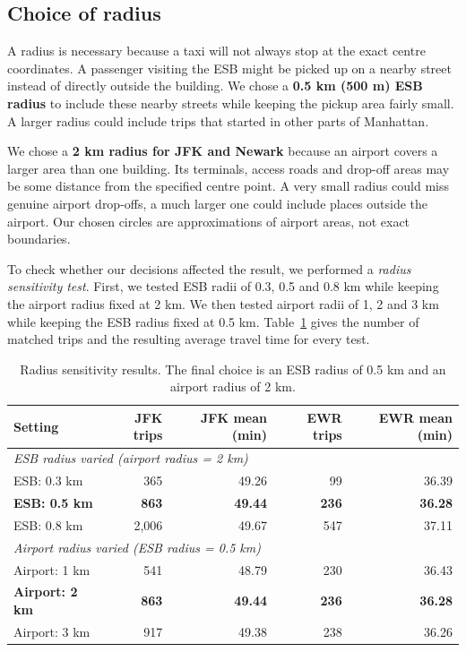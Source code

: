 \documentclass{article}
\begin{document}
\subsection*{Choice of radius}

A radius is necessary because a taxi will not always stop at the exact
centre coordinates. A passenger visiting the ESB might
be picked up on a nearby street instead of directly outside the
building. We chose a \textbf{0.5 km (500 m) ESB radius} to include these
nearby streets while keeping the pickup area fairly small. A larger
radius could include trips that started in other parts of Manhattan.

We chose a \textbf{2 km radius for JFK and Newark} because an airport
covers a larger area than one building. Its terminals, access roads and
drop-off areas may be some distance from the specified centre point. A
very small radius could miss genuine airport drop-offs, a much larger
one could include places outside the airport. Our chosen circles are
approximations of airport areas, not exact boundaries.

To check whether our decisions affected the result, we performed a
\emph{radius sensitivity test}. First, we tested ESB radii of 0.3,
0.5 and 0.8 km while keeping the airport radius fixed at 2 km. We
then tested airport radii of 1, 2 and 3 km while keeping the ESB radius
fixed at 0.5 km. Table~\ref{tab:q5_radii} gives the number of matched
trips and the resulting average travel time for every test.

\begin{table}[H]
    \centering
    \footnotesize
    \setlength{\tabcolsep}{3pt}
    \caption{Radius sensitivity results. The final choice is an ESB radius
    of 0.5 km and an airport radius of 2 km.}
    \label{tab:q5_radii}
    \begin{tabular}{lrrrr}
        \toprule
        Setting & JFK trips & JFK mean (min) & EWR trips & EWR mean (min) \\
        \midrule
        \multicolumn{5}{l}{\emph{ESB radius varied (airport radius = 2 km)}} \\
        ESB: 0.3 km & 365 & 49.26 & 99 & 36.39 \\
        \textbf{ESB: 0.5 km} & \textbf{863} & \textbf{49.44} & \textbf{236} & \textbf{36.28} \\
        ESB: 0.8 km & 2,006 & 49.67 & 547 & 37.11 \\
        \midrule
        \multicolumn{5}{l}{\emph{Airport radius varied (ESB radius = 0.5 km)}} \\
        Airport: 1 km & 541 & 48.79 & 230 & 36.43 \\
        \textbf{Airport: 2 km} & \textbf{863} & \textbf{49.44} & \textbf{236} & \textbf{36.28} \\
        Airport: 3 km & 917 & 49.38 & 238 & 36.26 \\
        \bottomrule
    \end{tabular}
\end{table}
\end{document}
